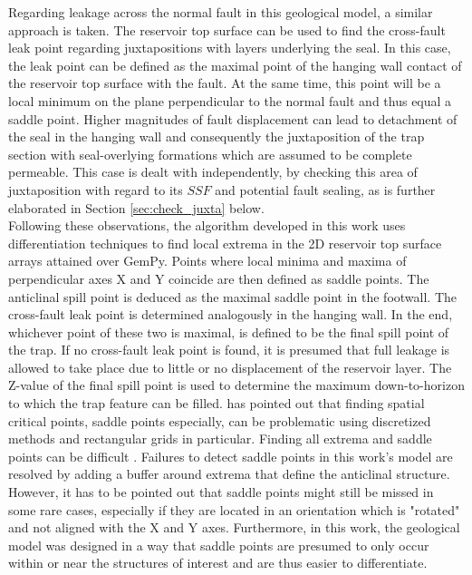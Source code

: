 			Regarding leakage across the normal fault in this geological model, a similar approach is taken. The reservoir top surface can be used to find the cross-fault leak point regarding juxtapositions with layers underlying the seal. In this case, the leak point can be defined as the maximal point of the hanging wall contact of the reservoir top surface with the fault. At the same time, this point will be a local minimum on the plane perpendicular to the normal fault and thus equal a saddle point. Higher magnitudes of fault displacement can lead to detachment of the seal in the hanging wall and consequently the juxtaposition of the trap section with seal-overlying formations which are assumed to be complete permeable. This case is dealt with independently, by checking this area of juxtaposition with regard to its $SSF$ and potential fault sealing, as is further elaborated in Section \ref{sec:check_juxta} below.\\
			Following these observations, the algorithm developed in this work uses differentiation techniques to find local extrema in the 2D reservoir top surface arrays attained over GemPy. Points where local minima and maxima of perpendicular axes X and Y coincide are then defined as saddle points. The anticlinal spill point is deduced as the maximal saddle point in the footwall. The cross-fault leak point is determined analogously in the hanging wall. In the end, whichever point of these two is maximal, is defined to be the final spill point of the trap. If no cross-fault leak point is found, it is presumed that full leakage is allowed to take place due to little or no displacement of the reservoir layer. The Z-value of the final spill point is used to determine the maximum down-to-horizon to which the trap feature can be filled.
			\citet{kuijper2004detecting} has pointed out that finding spatial critical points, saddle points especially, can be problematic using discretized methods and rectangular grids in particular. Finding all extrema and saddle points can be difficult \citep{kuijper2004detecting}. Failures to detect saddle points in this work's model are resolved by adding a buffer around extrema that define the anticlinal structure. However, it has to be pointed out that saddle points might still be missed in some rare cases, especially if they are located in an orientation which is "rotated" and not aligned with the X and Y axes. Furthermore, in this work, the geological model was designed in a way that saddle points are presumed to only occur within or near the structures of interest and are thus easier to differentiate.
						
